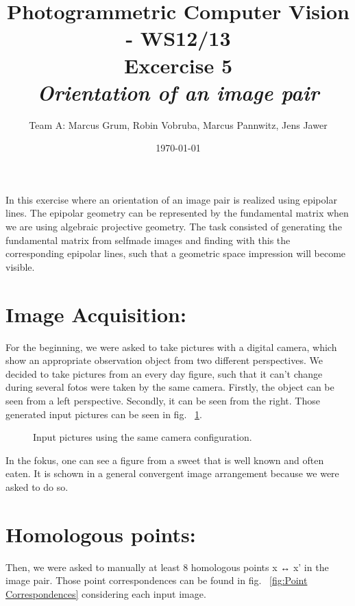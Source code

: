 \documentclass[a4paper,headings=small]{scrartcl}
\title{Photogrammetric Computer Vision - WS12/13 \\ Excercise 5 \\ \emph{Orientation of an image pair}}
\author{Team A: Marcus Grum, Robin Vobruba, Marcus Pannwitz, Jens Jawer}
\date{\today}
\numberwithin{equation}{section} %
\numberwithin{figure}{section}   %
\newcommand{\generatedImgRootImg}{../resources/img}
\begin{document}
\maketitle

In this exercise where an orientation of an image pair is realized using epipolar lines.
The epipolar geometry can be represented by the fundamental matrix
when we are using algebraic projective geometry. 
The task consisted of generating the fundamental matrix from selfmade images 
and finding with this the corresponding epipolar lines, 
such that a geometric space impression will become visible.

\section{Image Acquisition:}

For the beginning, we were asked to take pictures with a digital camera,
which show an appropriate observation object from two different perspectives.
We decided to take pictures from an every day figure, such that it can't change
during several fotos were taken by the same camera.
Firstly, the object can be seen from a left perspective.
Secondly, it can be seen from the right.
Those generated input pictures can be seen in fig. ~\ref{fig:Input pictures}.

\begin{figure}
   \hfill
  \caption{Input pictures using the same camera configuration.}
  \label{fig:Input pictures}
\end{figure}
  
In the fokus, one can see a figure from a sweet that is well known and often eaten.
It is schown in a general convergent image arrangement because we were asked to do so.
 
\section{Homologous points:}

Then, we were asked to manually at least 8 homologous points x ↔ x' in the image pair.
Those point correspondences can be found in fig. ~\ref{fig:Point Correspondences}
considering each input image.
\end{document}
